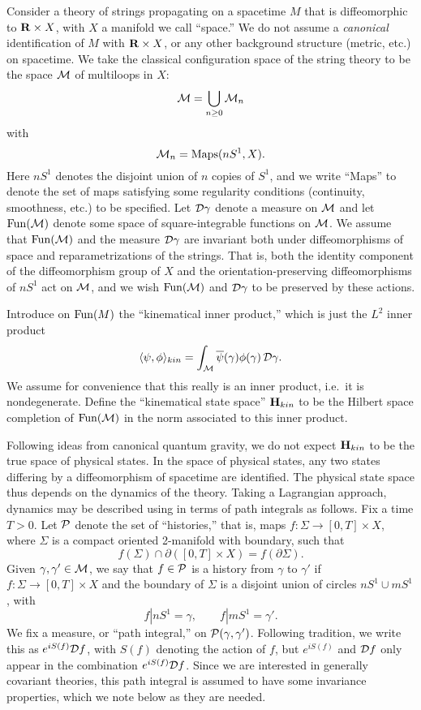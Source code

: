 \documentclass[12pt]{article}
\newcommand{\maps}{\colon}
\newcommand{\M}{{\cal M}}
\renewcommand{\P}{{\cal P}}
\newcommand{\D}{{\cal D}}
\renewcommand{\H}{{\bf H}}
\newcommand{\R}{{\bf R}}
\newcommand{\Maps}{{\rm Maps}}
\newcommand{\Fun}{{\rm Fun}}
\begin{document}
Consider a theory of strings
propagating on a spacetime $M$ that is diffeomorphic to
$\R\times X$, with $X$ a manifold we call ``space.'' We do not
assume a {\it canonical} identification of $M$ with
$\R\times X$, or any other background structure (metric, etc.) on
spacetime.  We take the classical
configuration space of the string theory to be the space $\M$
of multiloops in $X$:
\[ \M = \bigcup_{n \ge 0} \M_n \]
with
\[ \M_n = \Maps(nS^1, X) .\]
Here $nS^1$ denotes the disjoint union of $n$ copies
of $S^1$, and we write ``Maps'' to denote the set of maps satisfying
some regularity conditions (continuity, smoothness, etc.) to be
specified.  Let $\D\gamma$
denote a measure on $\M$ and let
$\Fun(\M)$ denote some space of square-integrable functions on $\M$.
We assume that $\Fun(\M)$ and the measure
$\D\gamma$ are invariant both under diffeomorphisms of space and
reparametrizations of the strings.  That is, both the
identity component of the diffeomorphism group of $X$ and
the orientation-preserving diffeomorphisms of $nS^1$
act on $\M$, and we wish $\Fun(\M)$ and $\D\gamma$ to be preserved by
these actions.

Introduce on $\Fun(M)$ the ``kinematical inner product,'' which is
just the $L^2$ inner product
\[ \langle \psi,\phi\rangle_{kin} = \int_{\M}
\overline\psi(\gamma) \phi(\gamma) \, \D\gamma  .\]
We assume for convenience that this really is an inner product, i.e.\
it is nondegenerate.
Define the ``kinematical state space''
$\H_{kin}$ to be the Hilbert space completion of
$\Fun(\M)$ in the norm associated to this inner product.

Following ideas from canonical quantum gravity, we do not expect $\H_{kin}$
to be the true space of physical states.   In the space of physical states,
any two states differing by a diffeomorphism of spacetime are identified.
The physical state space thus depends on the dynamics of the theory.
Taking a Lagrangian approach, dynamics may be described using in terms of
path integrals as follows.   Fix a time $T > 0$.  Let $\P$ denote the set
of ``histories,'' that is, maps $f \maps \Sigma \to [0,T] \times X$, where
$\Sigma$ is a compact oriented 2-manifold with boundary, such that
\[       f(\Sigma) \cap \partial([0,T] \times X) = f(\partial\Sigma) .\]
Given
$\gamma,\gamma' \in \M$, we say that $f \in \P$ is a history from $\gamma$
to $\gamma'$ if $f \maps \Sigma \to [0,T] \times X$ and the boundary of
$\Sigma$ is a disjoint union of circles $nS^1 \cup mS^1$, with
 \[          f|nS^1 = \gamma ,\qquad f|mS^1 = \gamma' .\]
We fix a measure, or ``path
integral,'' on $\P(\gamma,\gamma')$.  Following tradition, we write this as
$ e^{iS(f)} \D f$, with $S(f)$ denoting the action of $f$, but $e^{iS(f)}$
and $\D f$ only appear in the combination $ e^{iS(f)}\D f$.  Since we are
interested in generally covariant theories, this path integral is assumed
to have some invariance properties, which we note below as they are needed.
\end{document}

